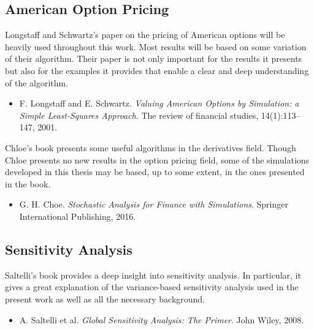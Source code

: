 \documentclass[a4paper,twocolumn,aps,prd,longbibliography,superscriptaddress]{revtex4-1}
\begin{document}
\subsection{American Option Pricing}
Longstaff and Schwartz's paper on the pricing of American options will be heavily used throughout this work. Most results will be based on some variation of their algorithm. Their paper is not only important for the results it presents but also for the examples it provides that enable a clear and deep understanding of the algorithm.
\begin{itemize}
\item  F. Longstaff and E. Schwartz. \textit{Valuing American Options by Simulation: a Simple Least-Squares Approach}. The review of financial studies, 14(1):113–147, 2001.
\end{itemize}

Chloe's book presents some useful algorithms in the derivatives field. Though Chloe presents no new results in the option pricing field, some of the simulations developed in this thesis may be based, up to some extent, in the ones presented in the book.
\begin{itemize}
\item G. H. Choe. \textit{Stochastic Analysis for Finance with Simulations}. Springer International Publishing, 2016.
\end{itemize}

\subsection{Sensitivity Analysis}
Saltelli's book provides a deep insight into sensitivity analysis. In particular, it gives a great explanation of the variance-based sensitivity analysis used in the present work as well as all the necessary background.
\begin{itemize}
\item A. Saltelli et al. \textit{Global Sensitivity Analysis: The Primer}. John Wiley, 2008.
\end{itemize}
\end{document}
